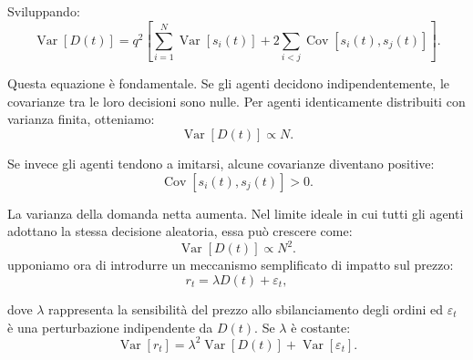 Sviluppando:
\[
\boxed{
\operatorname{Var}[D(t)]
=
q^2\left[
\sum_{i=1}^{N}\operatorname{Var}[s_i(t)]
+
2\sum_{i<j}\operatorname{Cov}[s_i(t),s_j(t)]
\right].
}
\]

Questa equazione è fondamentale.
Se gli agenti decidono indipendentemente, le covarianze tra le loro decisioni sono nulle. Per agenti identicamente distribuiti con varianza finita, 
otteniamo:
\[
\operatorname{Var}[D(t)]\propto N.
\]

Se invece gli agenti tendono a imitarsi, alcune covarianze diventano positive:
\[
\operatorname{Cov}[s_i(t),s_j(t)]>0.
\]

La varianza della domanda netta aumenta. Nel limite ideale in cui tutti gli agenti adottano la stessa decisione aleatoria, essa può crescere come:
\[
\operatorname{Var}[D(t)]\propto N^2.
\]
upponiamo ora di introdurre un meccanismo semplificato di impatto sul prezzo:
\[
r_t=\lambda D(t)+\varepsilon_t,
\]

dove \(\lambda\) rappresenta la sensibilità del prezzo allo sbilanciamento degli ordini ed \(\varepsilon_t\) è una perturbazione indipendente da \(D(t)\).
Se \(\lambda\) è costante:
\[
\boxed{
\operatorname{Var}[r_t]
=
\lambda^2\operatorname{Var}[D(t)]
+
\operatorname{Var}[\varepsilon_t].
}
\]

